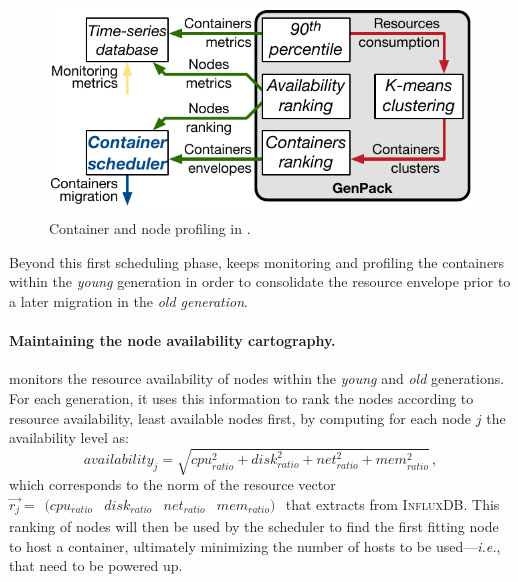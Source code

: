 \begin{figure}[t!]
	\centering
	\includegraphics[width=.7\linewidth]{Figures/profiling}
	\caption{Container and node profiling in \GP{}.}
	\label{fig:profiling}
\end{figure}

Beyond this first scheduling phase, \GP keeps monitoring and profiling the containers within the \emph{young} generation in order to consolidate the resource envelope prior to a later migration in the \emph{old generation}.

\paragraph{Maintaining the node availability cartography.}

\GP{} monitors the resource availability of nodes within the \emph{young} and \emph{old} generations.
For each generation, it uses this information to rank the nodes according to resource availability, least available nodes first, by computing for each node $j$ the availability level as:
\small
\[availability_j=\sqrt{cpu_{ratio}^2+disk_{ratio}^2+net_{ratio}^2+mem_{ratio}^2}\,,\]
\normalsize
\noindent which corresponds to the norm of the resource vector
$\vec{r_j}=\begin{matrix}(cpu_{ratio} & disk_{ratio} & net_{ratio} & mem_{ratio})\end{matrix}$
that \GP{} extracts from \textsc{InfluxDB}.
This ranking of nodes will then be used by the scheduler to find the first fitting node to host a container, ultimately minimizing the number of hosts to be used---\emph{i.e.}, that need to be powered up.
